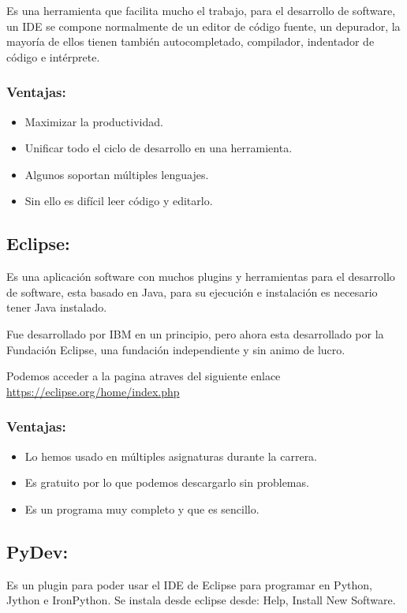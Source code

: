 Es una herramienta que facilita mucho el trabajo, para el desarrollo de software, un IDE se compone normalmente de un editor de código fuente, un depurador, la mayoría de ellos tienen también autocompletado, compilador, indentador de código e intérprete.

\subsubsection{Ventajas:}
\begin{itemize}
	\item Maximizar la productividad.
	\item Unificar todo el ciclo de desarrollo en una herramienta.
	\item Algunos soportan múltiples lenguajes. 
	\item Sin ello es difícil leer código y editarlo.
\end{itemize}

\subsection{Eclipse:}
Es una aplicación software con muchos plugins y herramientas para el desarrollo de software, esta basado en Java, para su ejecución e instalación es necesario tener Java instalado.

Fue desarrollado por IBM en un principio, pero ahora esta desarrollado por la Fundación Eclipse, una fundación independiente y sin animo de lucro.


Podemos acceder a la pagina atraves del siguiente enlace  \url{https://eclipse.org/home/index.php}

\subsubsection{Ventajas:}
\begin{itemize}
	\item Lo hemos usado en múltiples asignaturas durante la carrera.
	\item Es gratuito por lo que podemos descargarlo sin problemas.
	\item Es un programa muy completo y que es sencillo.
\end{itemize}

\subsection{PyDev:}
Es un plugin para poder usar el IDE de Eclipse para programar en Python, Jython e IronPython.
Se instala desde eclipse desde: Help, Install New Software.

